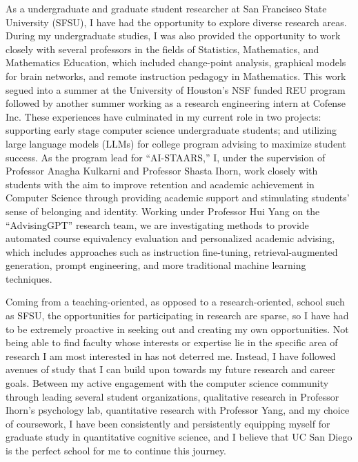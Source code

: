 \documentclass[12pt]{article}
\begin{document}
As a undergraduate and graduate student researcher at San Francisco State University (SFSU), I have had the opportunity to explore diverse
research areas. During my undergraduate studies, I was also provided the opportunity to work closely with several professors in the fields
of Statistics, Mathematics, and Mathematics Education, which included change-point analysis, graphical models for brain networks, and
remote instruction pedagogy in Mathematics. This work segued into a summer at the University of Houston's NSF funded REU program followed
by another summer working as a research engineering intern at Cofense Inc. These experiences have culminated in my current role in two
projects: supporting early stage computer science undergraduate students; and utilizing large language models (LLMs) for college program
advising to maximize student success. As the program lead for ``AI-STAARS,'' I, under the supervision of Professor Anagha Kulkarni and
Professor Shasta Ihorn, work closely with students with the aim to improve retention and academic achievement in Computer Science through
providing academic support and stimulating students' sense of belonging and identity. Working under Professor Hui Yang on the
``AdvisingGPT'' research team, we are investigating methods to provide automated course equivalency evaluation and personalized academic
advising, which includes approaches such as instruction fine-tuning, retrieval-augmented generation, prompt engineering, and more
traditional machine learning techniques.

Coming from a teaching-oriented, as opposed to a research-oriented, school such as SFSU, the opportunities for participating in research
are sparse, so I have had to be extremely proactive in seeking out and creating my own opportunities. Not being able to find faculty whose
interests or expertise lie in the specific area of research I am most interested in has not deterred me. Instead, I have followed avenues
of study that I can build upon towards my future research and career goals. Between my active engagement with the computer science
community through leading several student organizations, qualitative research in Professor Ihorn's psychology lab, quantitative research
with Professor Yang, and my choice of coursework, I have been consistently and persistently equipping myself for graduate study in
quantitative cognitive science, and I believe that UC San Diego is the perfect school for me to continue this journey.
\end{document}
